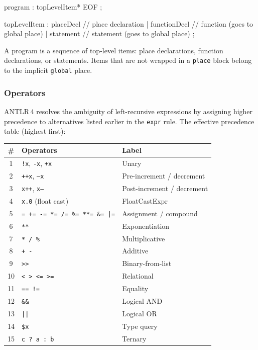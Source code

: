 \begin{codebox}
program : topLevelItem* EOF ;

topLevelItem
    : placeDecl       // place declaration
    | functionDecl    // function (goes to global place)
    | statement       // statement (goes to global place)
    ;
\end{codebox}

A program is a sequence of top-level items: place declarations,
function declarations, or statements. Items that are not wrapped in a
\texttt{place} block belong to the implicit \texttt{global} place.

\subsubsection{Operators}

ANTLR\,4 resolves the ambiguity of left-recursive expressions by assigning
higher precedence to alternatives listed earlier in the \texttt{expr} rule.
The effective precedence table (highest first):

\begin{center}
\begin{tabular}{|c|l|l|}
\hline
\textbf{\#} & \textbf{Operators} & \textbf{Label} \\
\hline
1 & \texttt{!x}, \texttt{-x}, \texttt{+x}   & Unary \\
2 & \texttt{++x}, \texttt{--x}               & Pre-increment / decrement \\
3 & \texttt{x++}, \texttt{x--}               & Post-increment / decrement \\
4 & \texttt{x.0} (float cast)                & FloatCastExpr \\
5 & \texttt{= += -= *= /= \%= **= \&= |=}   & Assignment / compound \\
6 & \texttt{**}                               & Exponentiation \\
7 & \texttt{* / \%}                           & Multiplicative \\
8 & \texttt{+ -}                              & Additive \\
9 & \texttt{>>}                               & Binary-from-list \\
10 & \texttt{< > <= >=}                       & Relational \\
11 & \texttt{== !=}                           & Equality \\
12 & \texttt{\&\&}                            & Logical AND \\
13 & \texttt{||}                              & Logical OR \\
14 & \texttt{\$x}                             & Type query \\
15 & \texttt{c ? a : b}                       & Ternary \\
\hline
\end{tabular}
\end{center}

